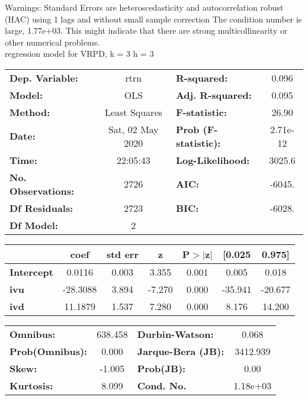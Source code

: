 Warnings: \newline
 [1] Standard Errors are heteroscedasticity and autocorrelation robust (HAC) using 1 lags and without small sample correction \newline
 [2] The condition number is large, 1.77e+03. This might indicate that there are \newline
 strong multicollinearity or other numerical problems.\\ 

regression model for VRPD, k = 3 h = 3\begin{center}
\begin{tabular}{lclc}
\toprule
\textbf{Dep. Variable:}    &       rtrn       & \textbf{  R-squared:         } &     0.096   \\
\textbf{Model:}            &       OLS        & \textbf{  Adj. R-squared:    } &     0.095   \\
\textbf{Method:}           &  Least Squares   & \textbf{  F-statistic:       } &     26.90   \\
\textbf{Date:}             & Sat, 02 May 2020 & \textbf{  Prob (F-statistic):} &  2.71e-12   \\
\textbf{Time:}             &     22:05:43     & \textbf{  Log-Likelihood:    } &    3025.6   \\
\textbf{No. Observations:} &        2726      & \textbf{  AIC:               } &    -6045.   \\
\textbf{Df Residuals:}     &        2723      & \textbf{  BIC:               } &    -6028.   \\
\textbf{Df Model:}         &           2      & \textbf{                     } &             \\
\bottomrule
\end{tabular}
\begin{tabular}{lcccccc}
                   & \textbf{coef} & \textbf{std err} & \textbf{z} & \textbf{P$> |$z$|$} & \textbf{[0.025} & \textbf{0.975]}  \\
\midrule
\textbf{Intercept} &       0.0116  &        0.003     &     3.355  &         0.001        &        0.005    &        0.018     \\
\textbf{ivu}       &     -28.3088  &        3.894     &    -7.270  &         0.000        &      -35.941    &      -20.677     \\
\textbf{ivd}       &      11.1879  &        1.537     &     7.280  &         0.000        &        8.176    &       14.200     \\
\bottomrule
\end{tabular}
\begin{tabular}{lclc}
\textbf{Omnibus:}       & 638.458 & \textbf{  Durbin-Watson:     } &    0.068  \\
\textbf{Prob(Omnibus):} &   0.000 & \textbf{  Jarque-Bera (JB):  } & 3412.939  \\
\textbf{Skew:}          &  -1.005 & \textbf{  Prob(JB):          } &     0.00  \\
\textbf{Kurtosis:}      &   8.099 & \textbf{  Cond. No.          } & 1.18e+03  \\
\bottomrule
\end{tabular}
\end{center}

